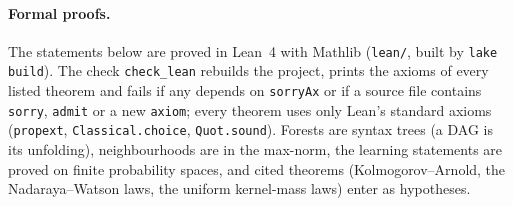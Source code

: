 \documentclass[11pt]{article}
\theoremstyle{definition}
\theoremstyle{remark}
\begin{document}
\paragraph{Formal proofs.}
The statements below are proved in Lean~4 with Mathlib
\citep{moura2021lean4,mathlib2020} (\texttt{lean/}, built by \texttt{lake build}).  The
check \texttt{check\_lean} rebuilds the project, prints the axioms of every listed theorem and
fails if any depends on \texttt{sorryAx} or if a source file contains \texttt{sorry},
\texttt{admit} or a new \texttt{axiom}; every theorem uses only Lean's standard axioms
(\texttt{propext}, \texttt{Classical.choice}, \texttt{Quot.sound}).  Forests are syntax trees
(a DAG is its unfolding), neighbourhoods are in the max-norm, the learning statements are
proved on finite probability spaces, and cited theorems (Kolmogorov--Arnold, the
Nadaraya--Watson laws, the uniform kernel-mass laws) enter as hypotheses.
\end{document}
